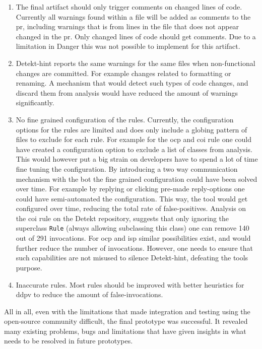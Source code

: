 \documentclass{report}
\begin{document}
\begin{enumerate}

    \item The final artifact should only trigger comments on changed lines of code. Currently all warnings found within a file will be added as comments to the \gls{pr}, including warnings that is from lines in the file that does not appear changed in the \gls{pr}. Only changed lines of code should get comments. Due to a limitation in Danger this was not possible to implement for this artifact.
    
    \item Detekt-hint reports the same warnings for the same files when non-functional changes are committed. For example changes related to formatting or renaming. A mechanism that would detect such types of code changes, and discard them from analysis would have reduced the amount of warnings significantly.
    
    \item No fine grained configuration of the rules. Currently, the configuration options for the rules are limited and does only include a globing pattern of files to exclude for each rule. For example for the \gls{ocp} and \gls{coi} rule one could have created a configuration option to exclude a list of classes from analysis. This would however put a big strain on developers have to spend a lot of time fine tuning the configuration. By introducing a two way communication mechanism with the bot the fine grained configuration could have been solved over time. For example by replying or clicking pre-made reply-options one could have semi-automated the configuration. This way, the tool would get configured over time, reducing the total rate of false-positives. Analysis on the \gls{coi} rule on the Detekt repository, suggests that only ignoring the superclass \texttt{Rule} (always allowing subclassing this class) one can remove 140 out of 291 invocations. For \gls{ocp} and \gls{isp} similar possibilities exist, and would further reduce the number of invocations. However, one needs to ensure that such capabilities are not misused to silence Detekt-hint, defeating the tools purpose.
    
    \item Inaccurate rules. Most rules should be improved with better heuristics for \gls{ddpv} to reduce the amount of false-invocations.
   
\end{enumerate}

All in all, even with the limitations that made integration and testing using the open-source community difficult, the final prototype was successful. It revealed many existing problems, bugs and limitations that have given insights in what needs to be resolved in future prototypes. 
\end{document}
